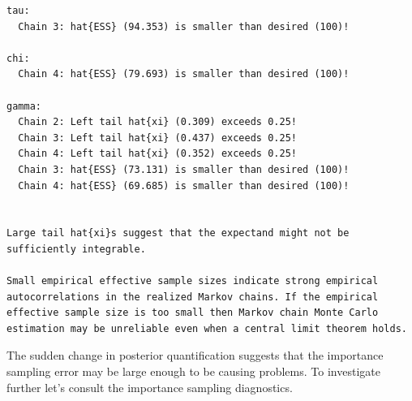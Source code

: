 \documentclass[
  letterpaper,
  DIV=11,
  numbers=noendperiod]{scrartcl}
\begin{document}
\begin{verbatim}
tau:
  Chain 3: hat{ESS} (94.353) is smaller than desired (100)!

chi:
  Chain 4: hat{ESS} (79.693) is smaller than desired (100)!

gamma:
  Chain 2: Left tail hat{xi} (0.309) exceeds 0.25!
  Chain 3: Left tail hat{xi} (0.437) exceeds 0.25!
  Chain 4: Left tail hat{xi} (0.352) exceeds 0.25!
  Chain 3: hat{ESS} (73.131) is smaller than desired (100)!
  Chain 4: hat{ESS} (69.685) is smaller than desired (100)!


Large tail hat{xi}s suggest that the expectand might not be
sufficiently integrable.

Small empirical effective sample sizes indicate strong empirical
autocorrelations in the realized Markov chains. If the empirical
effective sample size is too small then Markov chain Monte Carlo
estimation may be unreliable even when a central limit theorem holds.
\end{verbatim}

The sudden change in posterior quantification suggests that the
importance sampling error may be large enough to be causing problems. To
investigate further let's consult the importance sampling diagnostics.
\end{document}
